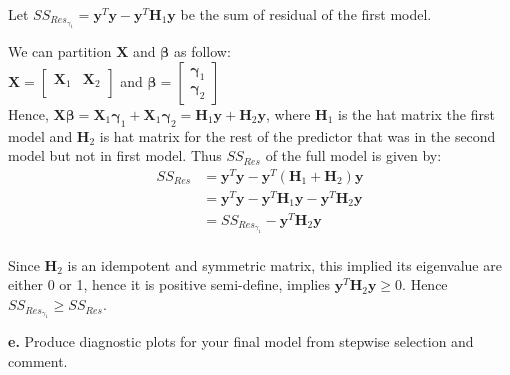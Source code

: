 \documentclass[12 pt, a4paper]{article}
\begin{document}
Let $SS_{Res_{\gamma_1}}=\textbf{y}^T\textbf{y}-\textbf{y}^T\textbf{H}_1\textbf{y}$ be the sum of residual of the first model.


\noindent We can partition $\textbf{X}$ and $\boldsymbol{\beta}$ as follow:\\

\noindent $\textbf{X}=
\left[
\begin{array}{c|c}
\textbf{X}_1 & \textbf{X}_2 \\
\end{array}
\right] $ and
$\boldsymbol{\beta}=
\left[
\begin{array}{c}
\boldsymbol{\gamma}_1 \\
\hline
\boldsymbol{\gamma}_2
\end{array}
\right] $ \\

\noindent Hence, $\textbf{X}\boldsymbol{\beta}=\textbf{X}_1\boldsymbol{\gamma}_1+\textbf{X}_1\boldsymbol{\gamma}_2=\textbf{H}_1\textbf{y}+\textbf{H}_2\textbf{y}$, where $\textbf{H}_1$ is the hat matrix the first model and $\textbf{H}_2$ is hat matrix for the rest of the predictor that was in the second model but not in first model.  Thus $SS_{Res}$ of the full model is given by: \\

\begin{align*}
SS_{Res}&=\textbf{y}^T\textbf{y}-\textbf{y}^T(\textbf{H}_1+\textbf{H}_2)\textbf{y} \\
&= \textbf{y}^T\textbf{y}-\textbf{y}^T\textbf{H}_1\textbf{y}-\textbf{y}^T\textbf{H}_2\textbf{y}\\
&=SS_{Res_{\gamma_1}}-\textbf{y}^T\textbf{H}_2\textbf{y}\\
\end{align*}

\noindent Since $\textbf{H}_2$ is an idempotent and symmetric matrix,  this implied its eigenvalue are either 0 or 1, hence it is positive semi-define,  implies $\textbf{y}^T\textbf{H}_2\textbf{y} \geq 0$.  Hence $SS_{Res_{\gamma_1}} \geq SS_{Res}$. 







\pagebreak
\textbf{e.} Produce diagnostic plots for your final model from stepwise selection and comment.
\end{document}
